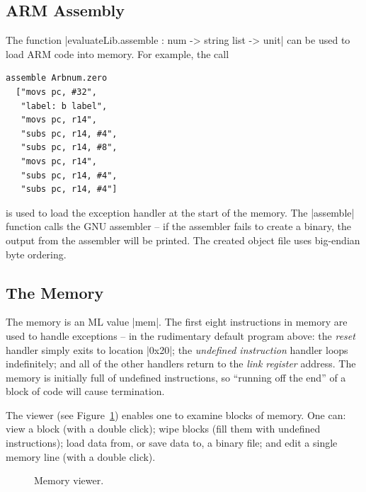 \documentclass[12pt]{article}
\newcommand{\F}{Figure~}
\begin{document}
\subsection*{ARM Assembly}

The function |evaluateLib.assemble : num -> string list -> unit| can be used to load ARM code into memory.  For example, the call
\begin{Verbatim}
assemble Arbnum.zero
  ["movs pc, #32",
   "label: b label",
   "movs pc, r14",
   "subs pc, r14, #4",
   "subs pc, r14, #8",
   "movs pc, r14",
   "subs pc, r14, #4",
   "subs pc, r14, #4"]
\end{Verbatim}
is used to load the exception handler at the start of the memory.  The |assemble| function calls the GNU assembler -- if the assembler fails to create a binary, the output from the assembler will be printed.  The created object file uses big-endian byte ordering.

\subsection*{The Memory}

The memory is an ML value |mem|.  The first eight instructions in memory are used to handle exceptions -- in the rudimentary default program above: the \emph{reset} handler simply exits to location |0x20|; the \emph{undefined instruction} handler loops indefinitely; and all of the other handlers return to the \emph{link register} address. The memory is initially full of undefined instructions, so ``running off the end'' of a block of code will cause termination.

The viewer (see \F\ref{mem:fig}) enables one to examine blocks of memory.  One can: view a block (with a double click); wipe blocks (fill them with undefined instructions); load data from, or save data to, a binary file; and edit a single memory line (with a double click).
\begin{figure}
\begin{center}
\caption{Memory viewer.}
\label{mem:fig}
\end{center}
\end{figure}
\end{document}
